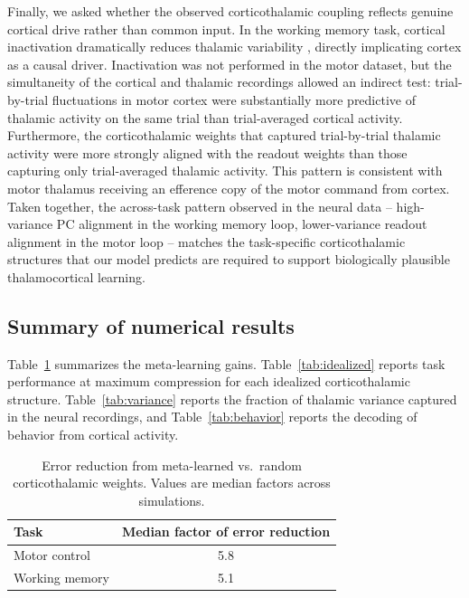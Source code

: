 \documentclass[11pt]{article}
\begin{document}
Finally, we asked whether the observed corticothalamic coupling
reflects genuine cortical drive rather than common input. In the
working memory task, cortical inactivation dramatically reduces
thalamic variability \cite{guo2017maintenance}, directly implicating
cortex as a causal driver. Inactivation was not performed in the motor
dataset, but the simultaneity of the cortical and thalamic recordings
allowed an indirect test: trial-by-trial fluctuations in motor cortex
were substantially more predictive of thalamic activity on the same
trial than trial-averaged cortical activity. Furthermore, the
corticothalamic weights that captured trial-by-trial thalamic activity
were more strongly aligned with the readout weights than those
capturing only trial-averaged thalamic activity. This pattern is
consistent with motor thalamus receiving an efference copy of the
motor command from cortex. Taken together, the across-task pattern
observed in the neural data -- high-variance PC alignment in the
working memory loop, lower-variance readout alignment in the motor
loop -- matches the task-specific corticothalamic structures that our
model predicts are required to support biologically plausible
thalamocortical learning.

\subsection{Summary of numerical results}

Table~\ref{tab:metalearning} summarizes the meta-learning gains.
Table~\ref{tab:idealized} reports task performance at maximum
compression for each idealized corticothalamic structure.
Table~\ref{tab:variance} reports the fraction of thalamic variance
captured in the neural recordings, and Table~\ref{tab:behavior}
reports the decoding of behavior from cortical activity.

\begin{table}[htbp]
\centering
\caption{Error reduction from meta-learned vs.\ random corticothalamic
weights. Values are median factors across simulations.}
\label{tab:metalearning}
\begin{tabular}{lc}
\toprule
Task & Median factor of error reduction \\
\midrule
Motor control & 5.8 \\
Working memory & 5.1 \\
\bottomrule
\end{tabular}
\end{table}
\end{document}
